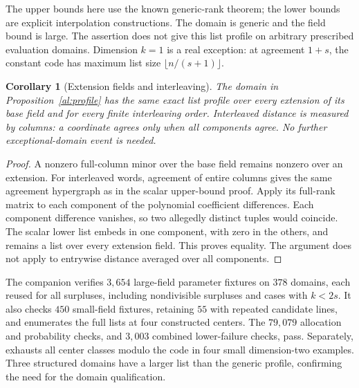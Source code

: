 \documentclass[11pt,letterpaper]{article}
\newtheorem{corollary}[theorem]{Corollary}
\theoremstyle{definition}
\theoremstyle{remark}
\begin{document}
The upper bounds here use the known generic-rank theorem; the lower
bounds are explicit interpolation constructions. The domain is generic
and the field bound is large. The assertion does not give this list
profile on arbitrary prescribed evaluation domains. Dimension $k=1$
is a real exception: at agreement $1+s$, the constant code has maximum
list size $\lfloor n/(s+1)\rfloor$.


\begin{corollary}[Extension fields and interleaving]
\label{cor:profile-extension}
The domain in Proposition~\ref{al:profile} has the same exact list
profile over every extension of its base field and for every finite
interleaving order. Interleaved distance is measured by columns: a
coordinate agrees only when all components agree. No further
exceptional-domain event is needed.
\end{corollary}
\begin{proof}
A nonzero full-column minor over the base field remains nonzero over
an extension. For interleaved words, agreement of entire columns gives
the same agreement hypergraph as in the scalar upper-bound proof.
Apply its full-rank matrix to each component of the polynomial
coefficient differences. Each component difference vanishes, so two
allegedly distinct tuples would coincide. The scalar lower list embeds
in one component, with zero in the others, and remains a list over
every extension field. This proves equality. The argument does not
apply to entrywise distance averaged over all components.
\end{proof}

The companion  verifies
$3{,}654$ large-field parameter fixtures on $378$ domains, each
reused for all surpluses, including nondivisible surpluses and cases
with $k<2s$. It also checks $450$ small-field
fixtures, retaining $55$ with repeated candidate lines, and enumerates
the full lists at four constructed centers. The $79{,}079$ allocation
and probability checks, and $3{,}003$ combined lower-failure checks,
pass. Separately,
 exhausts all center
classes modulo the code in four small dimension-two examples. Three
structured domains have a larger list than the generic profile,
confirming the need for the domain qualification.
\end{document}
